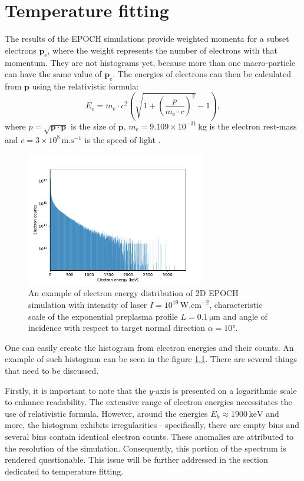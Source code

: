 \chapter{Temperature fitting}
\label{ch:temp-fitting-theory}
The results of the EPOCH simulations provide weighted momenta for a subset electrons $\bm{p}_\mathrm{e}$, where the weight represents the number of electrons with that momentum. They are not histograms yet, because more than one macro-particle can have the same value of $\bm{p}_\mathrm{e}$. The energies of electrons can then be calculated from $\bm{p}$ using the relativistic formula:
\begin{equation}
	\label{eq:rel-energy}
	E_\mathrm{e} = m_\mathrm{e}\cdot c^2\left(\sqrt{1+\left(\frac{p}{m_\mathrm{e}\cdot c}\right)^2} -1\right)\mathrm{,}
\end{equation}
where $p=\sqrt{\bm{p}\cdot\bm{p}}$ is the size of $\bm{p}$, $m_\mathrm{e} =  9.109 \times 10^{-31} \, \mathrm{kg}$ is the electron rest-mass and $c=3\times 10^{8} \, \mathrm{m . s}^{-1}$ is the speed of light \cite{cite-the-constants}.

\begin{figure}[h]
	\centering
	\includegraphics[width=0.7\textwidth]{figures/example-histogram}
	\caption{An example of electron energy distribution of 2D EPOCH simulation with intensity of laser $I=10^{19}\,\mathrm{W.cm}^{-2}$, characteristic scale of the exponential preplasma profile $L=0.1\,\mathrm{\mu m}$ and angle of incidence with respect to target normal direction $\alpha = 10$°.}
	\label{fig:example-histogram}
\end{figure}
One can easily create the histogram from electron energies and their counts. An example of such histogram can be seen in the figure \ref{fig:example-histogram}. There are several things that need to be discussed.

Firstly, it is important to note that the $y$-axis is presented on a logarithmic scale to enhance readability. The extensive range of electron energies necessitates the use of relativistic formula. However, around the energies $E_k \approx 1900 \, \mathrm{keV}$ and more, the histogram exhibits irregularities - specifically, there are empty bins and several bins contain identical electron counts. These anomalies are attributed to the resolution of the simulation. Consequently, this portion of the spectrum is rendered questionable. This issue will be further addressed in the section dedicated to temperature fitting.

